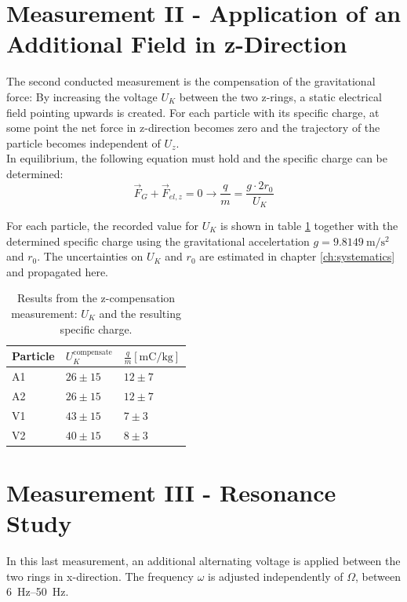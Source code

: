 \documentclass[
	paper=A4,
	parskip=full,
	chapterprefix=true,
	11pt,
	headings=normal,
	bibliography=totoc,
	listof=totoc,
	titlepage=on,
]{scrreprt}
\begin{document}
\section{Measurement II - Application of an Additional Field in z-Direction}
The second conducted measurement is the compensation of the gravitational force: By increasing the voltage $U_K$ between the two z-rings, a static electrical field pointing upwards is created. For each particle with its specific charge, at some point the net force in z-direction becomes zero and the trajectory of the particle becomes independent of $U_z$. \\
In equilibrium, the following equation must hold and the specific charge can be determined:
\begin{equation}
\vec{F}_G+\vec{F}_{el,z} = 0 \rightarrow \frac{q}{m} = \frac{g\cdot 2r_0}{U_K}
\end{equation}

For each particle, the recorded value for $U_K$ is shown in table \ref{tbl:Gcomp} together with the determined specific charge using the gravitational accelertation\cite{G_pres} $g=\SI{9.8149}{\meter\per\second^2}$ and $r_0$. The uncertainties on $U_K$ and $r_0$ are estimated in chapter \ref{ch:systematics} and propagated here.

\begin{table}[htbp]
	\centering
	\begin{tabular}{
			l
			l
			l
		}
		\toprule
		Particle & $U_K^{\textrm{compensate}}$ & $\frac{q}{m} [\si{\milli\coulomb\per\kilogram}]$  \\ 
		\midrule
		A1 & $26 \pm 15$ & $ 12 \pm 7 $\\
		A2 & $26 \pm 15$ & $ 12 \pm 7 $\\
		V1 & $43 \pm 15$ & $ 7 \pm 3  $\\
		V2 & $40 \pm 15$ & $ 8 \pm 3  $\\
		
		\bottomrule
	\end{tabular}
	\caption{Results from the z-compensation measurement: $U_K$ and the resulting specific charge.}
	\label{tbl:Gcomp}
\end{table}

\section{Measurement III - Resonance Study}
In this last measurement, an additional alternating voltage is applied between the two rings in x-direction. The frequency $\omega$ is adjusted independently of $\Omega$, between \SIrange{6}{50}{\hertz}.
\end{document}
